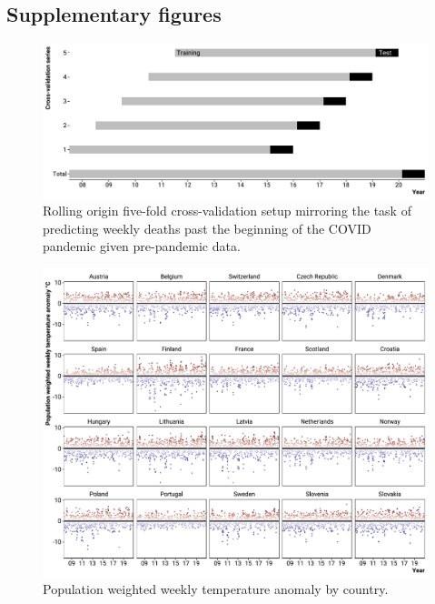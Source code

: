 \documentclass[12pt]{article}
\begin{document}
\begin{appendix}
[To be continued]

\subsection*{Supplementary figures}

\begin{figure}
\caption{Rolling origin five-fold cross-validation setup mirroring the task of predicting weekly deaths past the beginning of the COVID pandemic given pre-pandemic data.}
\includegraphics{cvsetup.pdf}
\end{figure}

\begin{figure}
  \caption{Population weighted weekly temperature anomaly by country.}
  \includegraphics{tanomaly.pdf}
  \end{figure}



\end{appendix}
\end{document}
